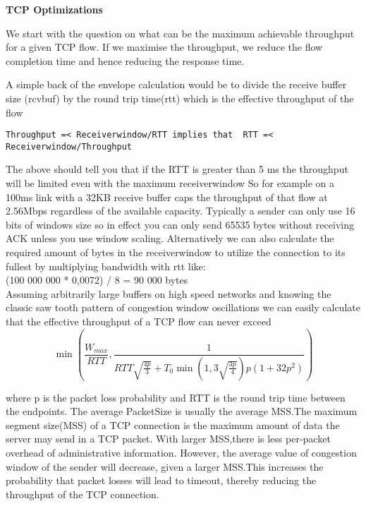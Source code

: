 \documentclass{article}
\begin{document}
\begin{center}
{\large{ \textbf{TCP Optimizations}}}\\ \vspace{0.1in}
\end{center}

We start with the question on what can be the maximum achievable throughput for a given TCP flow. If
we maximise the throughput, we reduce the flow completion time and hence reducing the response time.

A simple back of the envelope calculation would be to divide the receive buffer size (rcvbuf) by the round trip time(rtt) which is the effective throughput of the flow
\begin{verbatim}
Throughput =< Receiverwindow/RTT implies that  RTT =< Receiverwindow/Throughput
\end{verbatim}

The above should tell you that  if the RTT is greater than 5 ms the throughput will be limited even with the maximum receiverwindow
So for example on a 100ms link with a 32KB receive buffer caps the throughput of that flow at 2.56Mbps regardless of the available capacity.
Typically a sender can only use 16 bits of windows size so in effect you can only send 65535 bytes   without receiving ACK unless you use window scaling.
Alternatively we can also calculate the required amount of bytes in the receiverwindow to utilize the connection to its fullest by multiplying bandwidth with rtt like:\\
(100 000 000 * 0,0072) / 8 = 90 000 bytes\\

Assuming arbitrarily large buffers on high speed networks and knowing the classic saw tooth pattern of congestion window oscillations we can easily calculate that the effective throughput of a TCP flow can never exceed
\[
\min\left(\frac{W_{max}}{RTT},
\frac{1}
{RTT\sqrt{\frac{4p}{3}}+
 T_0\min\left(1,3\sqrt{\frac{3p}{4}}\right)p(1+32p^2)}\right)
\]

where p is the packet loss probability and RTT is the round trip time between the endpoints. The
average PacketSize is usually the average MSS.The maximum segment size(MSS) of a TCP connection is the
maximum amount of data the server may send in a TCP packet. With larger MSS,there is less per-packet
overhead of administrative information. However, the average value of congestion window of the sender will
decrease, given a larger MSS.This increases the probability that packet losses will lead to timeout, thereby
reducing the throughput of the TCP connection.
\end{document}
